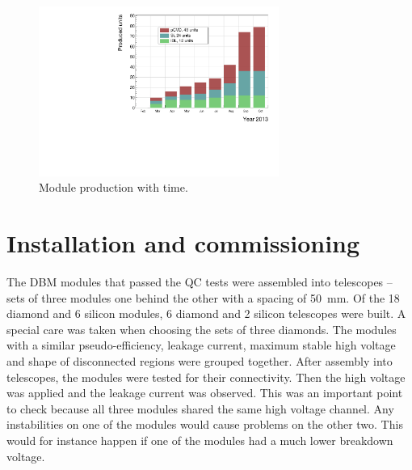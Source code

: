 \begin{figure}[!t]
\centering
\includegraphics[width=0.7\textwidth]{../scripts/04_charge_monitoring/plots/production1}
\caption{Module production with time.}
\label{fig:production}
\end{figure}



















\section{Installation and commissioning}
\label{sec:install}

The DBM modules that passed the QC tests were assembled into telescopes -- sets of three modules one behind the other with a spacing of 50~mm. Of the 18 diamond and 6 silicon modules, 6 diamond and 2 silicon telescopes were built. A special care was taken when choosing the sets of three diamonds. The modules with a similar pseudo-efficiency, leakage current, maximum stable high voltage and shape of disconnected regions were grouped together. After assembly into telescopes, the modules were tested for their connectivity. Then the high voltage was applied and the leakage current was observed. This was an important point to check because all three modules shared the same high voltage channel. Any instabilities on one of the modules would cause problems on the other two. This would for instance happen if one of the modules had a much lower breakdown voltage.


